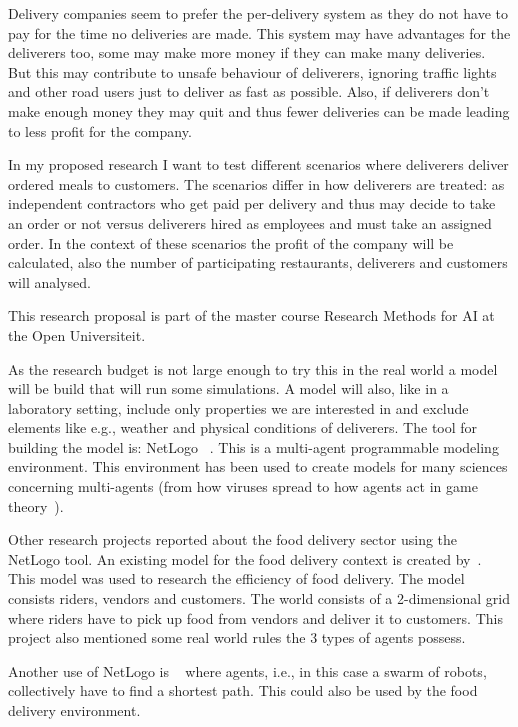 \documentclass{article}
\begin{document}
    Delivery companies seem to prefer the per-delivery system as they do not have to pay for the time no deliveries are made.
    This system may have advantages for the deliverers too, some may make more money if they can make many deliveries.
    But this may contribute to unsafe behaviour of deliverers, ignoring traffic lights and other road users just to deliver as fast as possible.
    Also, if deliverers don't make enough money they may quit and thus fewer deliveries can be made leading to less profit for the company.

    In my proposed research I want to test different scenarios where deliverers deliver ordered meals to customers.
    The scenarios differ in how deliverers are treated: as independent contractors who get paid per delivery and thus may decide to take an order or not versus
    deliverers hired as employees and must take an assigned order.
    In the context of these scenarios the profit of the company will be calculated, also the number of participating restaurants, deliverers and customers will analysed.

    This research proposal is part of the master course Research Methods for AI at the Open Universiteit.

    As the research budget is not large enough to try this in the real world a model will be build that will run some simulations.
    A model will also, like in a laboratory setting, include only properties we are interested in and exclude elements like e.g., weather and physical conditions of deliverers.
    The tool for building the model is: NetLogo ~\cite{NetLogo2024}.
    This is a multi-agent programmable modeling environment.
    This environment has been used to create models for many sciences concerning multi-agents (from how viruses spread to how agents act in game theory~\cite{r2019agent}).

    Other research projects reported about the food delivery sector using the NetLogo tool.
    An existing model for the food delivery context is created by~\cite{ismail2024software}.
    This model was used to research the efficiency of food delivery.
    The model consists riders, vendors and customers.
    The world consists of a 2-dimensional grid where riders have to pick up food from vendors and deliver it to customers.
    This project also mentioned some real world rules the 3 types of agents possess.

    Another use of NetLogo is ~\cite{chella2023quantum} where agents, i.e., in this case a swarm of robots, collectively have to find a shortest path.
    This could also be used by the food delivery environment.
\end{document}
